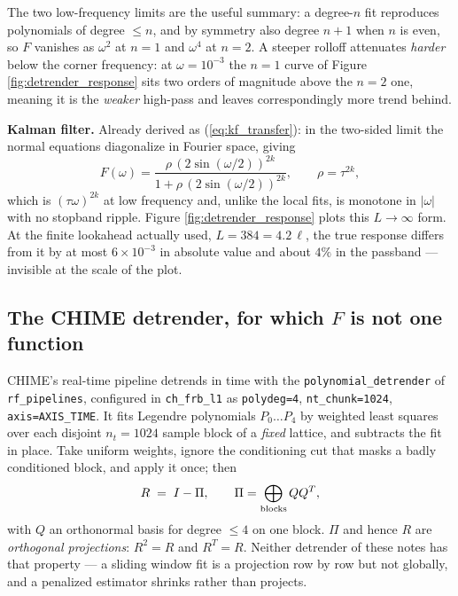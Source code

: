 \documentclass{article}
\numberwithin{equation}{section}   %
\begin{document}
\noindent
The two low-frequency limits are the useful summary: a degree-$n$ fit reproduces polynomials of degree
$\le n$, and by symmetry also degree $n+1$ when $n$ is even, so $F$ vanishes as $\omega^{2}$ at $n=1$ and
$\omega^{4}$ at $n=2$.  A steeper rolloff attenuates {\em harder} below the corner frequency: at
$\omega = 10^{-3}$ the $n=1$ curve of Figure \ref{fig:detrender_response} sits two orders of magnitude above
the $n=2$ one, meaning it is the {\em weaker} high-pass and leaves correspondingly more trend behind.

{\bf Kalman filter.}  Already derived as (\ref{eq:kf_transfer}): in the two-sided limit the normal equations
diagonalize in Fourier space, giving
\begin{equation}
F(\omega) = \frac{\rho\,(2\sin(\omega/2))^{2k}}{1 + \rho\,(2\sin(\omega/2))^{2k}},
\qquad \rho = \tau^{2k} ,
\label{eq:ar_kf}
\end{equation}
which is $(\tau\omega)^{2k}$ at low frequency and, unlike the local fits, is monotone in $|\omega|$ with no
stopband ripple.  Figure \ref{fig:detrender_response} plots this $L \rightarrow \infty$ form.  At the finite
lookahead actually used, $L = 384 = 4.2\,\ell$, the true response differs from it by at most
$6\times10^{-3}$ in absolute value and about $4\%$ in the passband --- invisible at the scale of the plot.

\subsection{The CHIME detrender, for which $F$ is not one function}
\label{sec:ar_chime}

CHIME's real-time pipeline detrends in time with the {\tt polynomial\_detrender} of {\tt rf\_pipelines},
configured in {\tt ch\_frb\_l1} as {\tt polydeg=4}, {\tt nt\_chunk=1024}, {\tt axis=AXIS\_TIME}.  It fits
Legendre polynomials $P_0 \ldots P_4$ by weighted least squares over each disjoint $n_t = 1024$ sample block
of a {\em fixed} lattice, and subtracts the fit in place.  Take uniform weights, ignore the conditioning cut
that masks a badly conditioned block, and apply it once; then
\begin{equation}
R \;=\; I - \Pi , \qquad \Pi = \bigoplus_{\rm blocks} QQ^T ,
\end{equation}
with $Q$ an orthonormal basis for degree $\le 4$ on one block.  $\Pi$ and hence $R$ are {\em orthogonal
projections}: $R^2 = R$ and $R^T = R$.  Neither detrender of these notes has that property --- a sliding
window fit is a projection row by row but not globally, and a penalized estimator shrinks rather than
projects.
\end{document}
